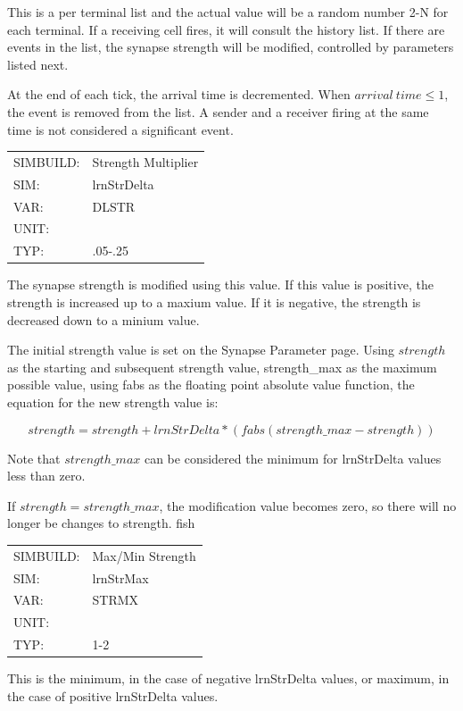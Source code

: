 \documentclass[12pt,openany,oneside]{book}
\begin{document}
This is a per terminal list and the actual value will be a random number
2-N for each terminal. If a receiving cell fires, it 
will consult the history list.  If
there are events in the list, the synapse strength will be modified,
controlled by parameters listed next. 

At the end of each tick, the 
arrival time is decremented. When $arrival\ time \le 1$, the
event is removed from the list. A sender and a receiver firing at
the same time is not considered a significant event.
\filbreak
\vspace{\baselineskip}

\begin{flushleft}
\begin{tabular}{@{}ll@{}}
SIMBUILD: & Strength Multiplier\\
SIM: & lrnStrDelta\\
VAR: & DLSTR\\
UNIT: & \\
TYP: & .05-.25\\
\end{tabular}
\end{flushleft}
\noindent
The synapse strength is modified using this value. If this
value is positive, the strength is increased up to a maxium value. If it
is negative, the strength is decreased down to a minium value.  

The initial strength value is set on the Synapse Parameter page. Using
$strength$ as the starting and subsequent strength value, strength\_max as
the maximum possible value, using fabs as the floating point absolute
value function, the equation for the new strength value is: 

\[strength = strength + lrnStrDelta * (fabs(strength\_max - strength))\]

Note that $strength\_max$ can be considered the minimum for lrnStrDelta
values less than zero.

If $strength = strength\_max$, the modification value 
becomes zero, so there will no longer be changes to strength.
\filbreak
\vspace{\baselineskip}
fish

\begin{flushleft}
\begin{tabular}{@{}ll@{}}
SIMBUILD: & Max/Min Strength\\
SIM: & lrnStrMax\\
VAR: & STRMX\\
UNIT: & \\
TYP: & 1-2\\
\end{tabular}
\end{flushleft}
\noindent
This is the minimum, in the case of negative lrnStrDelta values, or maximum,
in the case of positive lrnStrDelta values. 
\end{document}
